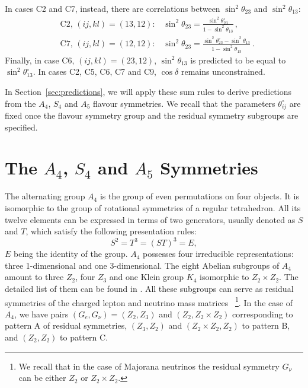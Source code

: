 \documentclass[11pt,a4paper]{article}
\newcommand{\be}{\begin{equation}}
\newcommand{\ee}{\end{equation}}
\def\th{\theta}
\numberwithin{equation}{section}
\begin{document}
%
In cases C2 and C7, instead, there are correlations between
$\sin^2\th_{23}$ and $\sin^2\th_{13}$:
\begin{align}
&\text{C2, $(ij,kl) = (13,12)$:} \quad 
\sin^2 \theta_{23} = \frac{\sin^2 \theta^{\circ}_{23}}{1 - \sin^2 \theta_{13}}\,, 
\label{eq:ss23C2}\\[0.2cm]
&\text{C7, $(ij,kl) = (12,12)$:} \quad 
\sin^2 \theta_{23} = \frac{\sin^2 \theta^\circ_{23} - \sin^2 \theta_{13}}
{1 - \sin^2 \theta_{13}}\,.
\label{eq:ss23C7}
\end{align}
%
Finally, in case C6, $(ij,kl) = (23,12)$, $\sin^2\th_{13}$ 
is predicted to be equal to $\sin^2\th^\circ_{13}$. 
In cases C2, C5, C6, C7 and C9, $\cos\delta$ remains unconstrained.

 In Section~\ref{sec:predictions}, we will apply these sum rules 
to derive predictions from the $A_4$, $S_4$ and $A_5$ flavour symmetries. 
We recall that the parameters $\th^\circ_{ij}$ are fixed once 
the flavour symmetry group and the residual symmetry subgroups are specified.


\section{The $A_4$, $S_4$ and $A_5$ Symmetries}
\label{sec:groups}

 The alternating group $A_4$ is the group of even permutations on four objects. 
It is isomorphic to the group of rotational symmetries of a regular tetrahedron.  
All its twelve elements can be expressed in terms of two generators, 
usually denoted as $S$ and $T$, which satisfy the following presentation rules: 
\be
S^2 = T^3 = (ST)^3 = E,   
\ee
%
$E$ being the identity of the group.
$A_4$ possesses four irreducible representations: 
three 1-dimensional and one 3-dimensional. 
The eight Abelian subgroups of $A_4$ amount to  
three $Z_2$, four $Z_3$ and one Klein group $K_4$ isomorphic to $Z_2\times Z_2$.
The detailed list of them can be found in \cite{Tanimoto:2015nfa}.
All these subgroups can serve as residual symmetries 
of the charged lepton and neutrino mass matrices~%
\footnote{We recall that in the case of Majorana neutrinos 
the residual symmetry $G_\nu$ 
can be either $Z_2$ or $Z_2\times Z_2$.}.
In the case of $A_4$, we have pairs 
$(G_e,G_\nu) = (Z_2,Z_3)$ and $(Z_2,Z_2\times Z_2)$
corresponding to pattern A of residual symmetries, 
$ (Z_3,Z_2)$ and $(Z_2\times Z_2,Z_2)$ to pattern B, 
and $(Z_2,Z_2)$ to pattern C.
\end{document}

